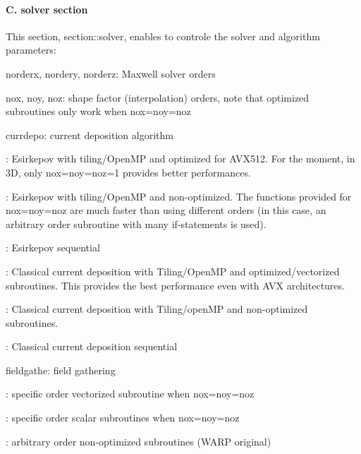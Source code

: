 \paragraph*{C. solver section}

This section, {\ttfamily section\+::solver}, enables to controle the solver and algorithm parameters\+:


\begin{DoxyItemize}
\item {\ttfamily norderx}, {\ttfamily nordery}, {\ttfamily norderz}\+: Maxwell solver orders
\item {\ttfamily nox}, {\ttfamily noy}, {\ttfamily noz}\+: shape factor (interpolation) orders, note that optimized subroutines only work when {\ttfamily nox=noy=noz}
\item {\ttfamily currdepo}\+: current deposition algorithm
\begin{DoxyItemize}
\item {}\+: Esirkepov with tiling/\+Open\+MP and optimized for A\+V\+X512. For the moment, in 3D, only {\ttfamily nox=noy=noz=1} provides better performances.
\item {}\+: Esirkepov with tiling/\+Open\+MP and non-\/optimized. The functions provided for {\ttfamily nox=noy=noz} are much faster than using different orders (in this case, an arbitrary order subroutine with many if-\/statements is used).
\item {}\+: Esirkepov sequential
\item {}\+: Classical current deposition with Tiling/\+Open\+MP and optimized/vectorized subroutines. This provides the best performance even with A\+VX architectures.
\item {}\+: Classical current deposition with Tiling/open\+MP and non-\/optimized subroutines.
\item {}\+: Classical current deposition sequential
\end{DoxyItemize}
\item {\ttfamily fieldgathe}\+: field gathering
\begin{DoxyItemize}
\item {}\+: specific order vectorized subroutine when {\ttfamily nox=noy=noz}
\item {}\+: specific order scalar subroutines when {\ttfamily nox=noy=noz}
\item {}\+: arbitrary order non-\/optimized subroutines (W\+A\+RP original)
\end{DoxyItemize}

\end{DoxyItemize}
